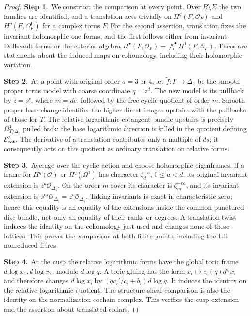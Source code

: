 \documentclass[11pt,a4paper]{article}
\theoremstyle{plain}
\theoremstyle{definition}
\begin{document}
\begin{proof}
\par\smallskip\noindent\textbf{Step 1.}\ We construct the comparison at every point. Over $B\setminus\Sigma$
the two families are identified, and a translation acts trivially on
$H^q(F,\mathcal O_F)$ and $H^q(F,\Omega^1_F)$ for a complex torus $F$.
For the second assertion, translation fixes the invariant holomorphic
one-forms, and the first follows either from invariant Dolbeault forms
or the exterior algebra $H^\bullet(F,\mathcal O_F)=\bigwedge^\bullet H^1(F,\mathcal O_F)$.
These are statements about the induced maps on cohomology, including
their holomorphic variation.

\par\smallskip\noindent\textbf{Step 2.}\ At a point with original order $d=3$ or $4$, let
$\widetilde f:T\to\Delta_z$ be the smooth proper torus model with
coarse coordinate $q=z^d$. The new model is its pullback by $z=s^e$,
where $m=de$, followed by the free cyclic quotient of order $m$.
Smooth proper base change identifies the higher direct images upstairs
with the pullbacks of those for $T$. The relative logarithmic cotangent
bundle upstairs is precisely $\Omega^1_{T/\Delta_z}$ pulled back:
the base logarithmic direction is killed in the quotient defining $\mathcal E_{\rm cot}'$.
The derivative of a translation contributes only a multiple of $ds$;
it consequently acts on this quotient as ordinary translation on relative forms.

\par\smallskip\noindent\textbf{Step 3.}\ Average over the cyclic action and choose holomorphic eigenframes.
If a frame for $H^q(\mathcal O)$ or $H^q(\Omega^1)$ has character
$\zeta_d^{-a}$, $0\le a<d$, its original invariant extension is
$z^a\mathcal O_{\Delta_q}$. On the order-$m$ cover its character is
$\zeta_m^{-ea}$, and its invariant extension is
$s^{ea}\mathcal O_{\Delta_q}=z^a\mathcal O_{\Delta_q}$.
Taking invariants is exact in characteristic zero; hence this equality
is an equality of the extensions inside the common punctured-disc
bundle, not only an equality of their ranks or degrees. A translation
twist induces the identity on the cohomology just used and changes none
of these lattices. This proves the comparison at both finite points,
including the full nonreduced fibres.

\par\smallskip\noindent\textbf{Step 4.}\ At the cusp the relative logarithmic forms have the global toric frame
$d\log x_1,d\log x_2$, modulo $d\log q$.
A toric gluing has the form
$x_i\mapsto c_i(q)q^{b_i}x_i$ and therefore changes $d\log x_i$ by
$(q c_i'/c_i+b_i)d\log q$. It induces the identity on the relative
logarithmic quotient. The structure-sheaf comparison is also the identity
on the normalization cochain complex. This verifies the cusp extension
and the assertion about translated collars.


\end{proof}
\end{document}
